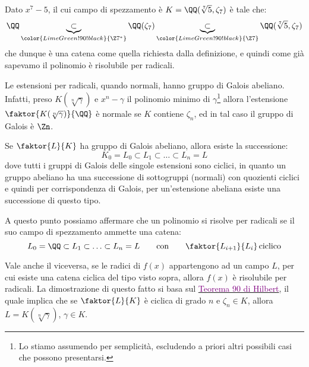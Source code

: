 \documentclass[11pt]{scrartcl}
\begin{document}
\begin{example}
    Dato $x^7 - 5$, il cui campo di spezzamento è $K = \QQ(\sqrt[7]{5},\zeta_7)$ è tale che:
    \[ \QQ \underbrace{\subset}_{\color{LimeGreen!90!black}{\Z7^*}} \QQ(\zeta_7) \underbrace{\subset}_{\color{LimeGreen!90!black}{\Z7}} \QQ(\sqrt[7]{5},\zeta_7)
        \]
    che dunque è una catena come quella richiesta dalla definizione, e quindi come già sapevamo il polinomio è risolubile per radicali.
\end{example}

\begin{remark}
    Le estensioni per radicali, quando normali, hanno gruppo di Galois abeliano. Infatti, preso $K(\sqrt[n]{\gamma})$ e $x^n-\gamma$ il polinomio minimo di $\gamma$\footnote{Lo stiamo assumendo per semplicità, escludendo a priori altri possibili casi che possono presentarsi.}
    allora l'estensione $\faktor{K(\sqrt[n]{\gamma})}{\QQ}$ è normale se $K$ contiene $\zeta_n$, ed in tal caso il gruppo di Galois è $\Zn$.
\end{remark}

\begin{remark}
    Se $\faktor{L}{K}$ ha gruppo di Galois abeliano, allora esiste la successione:
    \[ K_0 = L_0 \subset L_1 \subset \ldots \subset L_n = L
        \]
    dove tutti i gruppi di Galois delle singole estensioni sono ciclici, in quanto un gruppo abeliano ha una successione di sottogruppi (normali) con quozienti ciclici e quindi per corrispondenza di Galois, per un'estensione abeliana esiste una successione di questo tipo.
\end{remark}

A questo punto possiamo affermare che un polinomio si risolve per radicali se il suo campo di spezzamento ammette una catena:
\[ L_0 = \QQ \subset L_1 \subset \ldots \subset L_n = L \qquad \text{con} \qquad \faktor{L_{i+1}}{L_i}\,\text{ciclico}
    \]

\begin{remark}
    Vale anche il viceversa, se le radici di $f(x)$ appartengono ad un campo $L$, per cui esiste una catena ciclica del tipo visto sopra, allora $f(x)$ è risolubile per radicali. La dimostrazione di questo fatto si basa sul \href{https://en.wikipedia.org/wiki/Hilbert%27s_Theorem_90}{\textcolor{purple}{Teorema 90 di Hilbert}}, il quale
    implica che se $\faktor{L}{K}$ è ciclica di grado $n$ e $\zeta_n \in K$, allora $L = K(\sqrt[n]{\gamma})$, $\gamma \in K$.
\end{remark}
\end{document}
